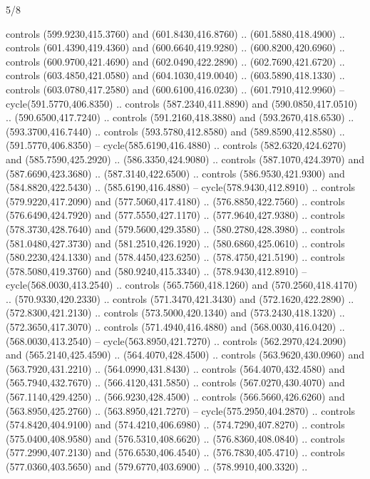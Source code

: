 \begin{flagdescription}{5/8}
\begin{scope}[shift={(m)}]
\begin{scope}[scale=\flagwidth/220,y=0.1mm, x=0.1mm, yscale=-1,shift={(-596,-360)}]
\begin{scope}[line width=0.381\lw]
\begin{scope}[draw=black]
  controls (599.9230,415.3760) and (601.8430,416.8760) .. (601.5880,418.4900) ..
  controls (601.4390,419.4360) and (600.6640,419.9280) .. (600.8200,420.6960) ..
  controls (600.9700,421.4690) and (602.0490,422.2890) .. (602.7690,421.6720) ..
  controls (603.4850,421.0580) and (604.1030,419.0040) .. (603.5890,418.1330) ..
  controls (603.0780,417.2580) and (600.6100,416.0230) .. (601.7910,412.9960) --
  cycle(591.5770,406.8350) .. controls (587.2340,411.8890) and
  (590.0850,417.0510) .. (590.6500,417.7240) .. controls (591.2160,418.3880) and
  (593.2670,418.6530) .. (593.3700,416.7440) .. controls (593.5780,412.8580) and
  (589.8590,412.8580) .. (591.5770,406.8350) -- cycle(585.6190,416.4880) ..
  controls (582.6320,424.6270) and (585.7590,425.2920) .. (586.3350,424.9080) ..
  controls (587.1070,424.3970) and (587.6690,423.3680) .. (587.3140,422.6500) ..
  controls (586.9530,421.9300) and (584.8820,422.5430) .. (585.6190,416.4880) --
  cycle(578.9430,412.8910) .. controls (579.9220,417.2090) and
  (577.5060,417.4180) .. (576.8850,422.7560) .. controls (576.6490,424.7920) and
  (577.5550,427.1170) .. (577.9640,427.9380) .. controls (578.3730,428.7640) and
  (579.5600,429.3580) .. (580.2780,428.3980) .. controls (581.0480,427.3730) and
  (581.2510,426.1920) .. (580.6860,425.0610) .. controls (580.2230,424.1330) and
  (578.4450,423.6250) .. (578.4750,421.5190) .. controls (578.5080,419.3760) and
  (580.9240,415.3340) .. (578.9430,412.8910) -- cycle(568.0030,413.2540) ..
  controls (565.7560,418.1260) and (570.2560,418.4170) .. (570.9330,420.2330) ..
  controls (571.3470,421.3430) and (572.1620,422.2890) .. (572.8300,421.2130) ..
  controls (573.5000,420.1340) and (573.2430,418.1320) .. (572.3650,417.3070) ..
  controls (571.4940,416.4880) and (568.0030,416.0420) .. (568.0030,413.2540) --
  cycle(563.8950,421.7270) .. controls (562.2970,424.2090) and
  (565.2140,425.4590) .. (564.4070,428.4500) .. controls (563.9620,430.0960) and
  (563.7920,431.2210) .. (564.0990,431.8430) .. controls (564.4070,432.4580) and
  (565.7940,432.7670) .. (566.4120,431.5850) .. controls (567.0270,430.4070) and
  (567.1140,429.4250) .. (566.9230,428.4500) .. controls (566.5660,426.6260) and
  (563.8950,425.2760) .. (563.8950,421.7270) -- cycle(575.2950,404.2870) ..
  controls (574.8420,404.9100) and (574.4210,406.6980) .. (574.7290,407.8270) ..
  controls (575.0400,408.9580) and (576.5310,408.6620) .. (576.8360,408.0840) ..
  controls (577.2990,407.2130) and (576.6530,406.4540) .. (576.7830,405.4710) ..
  controls (577.0360,403.5650) and (579.6770,403.6900) .. (578.9910,400.3320) ..

\end{scope}
\end{scope}
\end{scope}
\end{scope}
\end{flagdescription}
